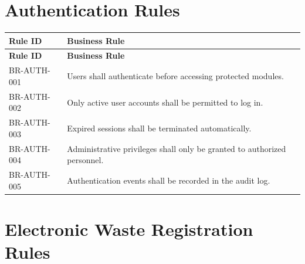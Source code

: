\section{Authentication Rules}
\label{sec:authentication-rules}

\begin{longtable}{|p{3cm}|p{10cm}|}

\hline
\textbf{Rule ID} &
\textbf{Business Rule}\\
\hline
\endfirsthead

\hline
\textbf{Rule ID} &
\textbf{Business Rule}\\
\hline
\endhead

BR-AUTH-001 &
Users shall authenticate before accessing protected modules.\\
\hline

BR-AUTH-002 &
Only active user accounts shall be permitted to log in.\\
\hline

BR-AUTH-003 &
Expired sessions shall be terminated automatically.\\
\hline

BR-AUTH-004 &
Administrative privileges shall only be granted to authorized personnel.\\
\hline

BR-AUTH-005 &
Authentication events shall be recorded in the audit log.\\
\hline

\end{longtable}

\section{Electronic Waste Registration Rules}
\label{sec:waste-registration-rules}


